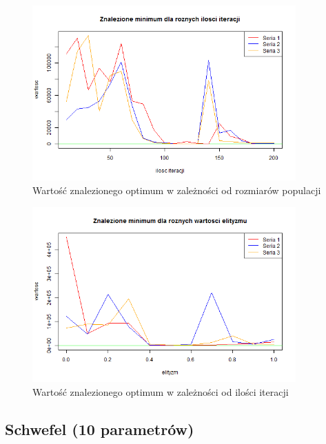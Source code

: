 \documentclass[11pt, a4paper]{article}
\begin{document}
\begin{figure}[H]
	\begin{center}
		\includegraphics[width=0.9\textwidth]{./assets/PriceTransistor5.png} %
		\caption{Wartość znalezionego optimum w zależności od rozmiarów populacji}
		\label{fig:pricetransistor5}
	\end{center}
\end{figure}

\begin{figure}[H]
	\begin{center}
		\includegraphics[width=0.9\textwidth]{./assets/PriceTransistor6.png} %
		\caption{Wartość znalezionego optimum w zależności od ilości iteracji}
		\label{fig:pricetransistor6}
	\end{center}
\end{figure}

\subsection{Schwefel (10 parametrów)}
\end{document}

